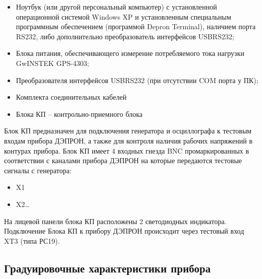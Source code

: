 \begin{itemize}
	\item 	Ноутбук (или другой персональный компьютер) с установленной операционной системой Windows XP и установленным специальным программным обеспечением (программой Depron Terminal), наличием порта RS232, либо дополнительно преобразователь интерфейсов USBRS232;
	
	
	\item 	Блока питания, обеспечивающего измерение потребляемого тока нагрузки GwINSTEK GPS-4303;
	
	
	\item 	Преобразователя интерфейсов USBRS232 (при отсутствии COM порта у ПК);
	
	
	\item 	Комплекта соединительных кабелей 
	
	
	\item 	Блока КП -- контрольно-приемного блока
	
	
\end{itemize}








Блок КП предназначен для подключения генератора и осциллографа к тестовым входам прибора ДЭПРОН, а также для контроля наличия рабочих напряжений в контурах прибора. Блок КП имеет 4 входных гнезда BNC промаркированных в соответствии с каналами прибора ДЭПРОН на которые передаются тестовые сигналы с генератора: 



\begin{itemize}
	
	\item 	X1	
	
	\item 	X2\ldots
		
\end{itemize}

На лицевой панели блока КП расположены 2 светодиодных индикатора. Подключение Блока КП к прибору ДЭПРОН происходит через тестовый вход XT3 (типа РС19).


\subsection{Градуировочные  характеристики прибора}

